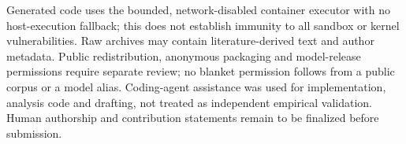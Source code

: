 \documentclass{article}
\begin{document}
Generated code uses the bounded, network-disabled container executor with no
host-execution fallback; this does not establish immunity to all sandbox or
kernel vulnerabilities. Raw archives may contain literature-derived text and
author metadata. Public redistribution, anonymous packaging and model-release
permissions require separate review; no blanket permission follows from a
public corpus or a model alias. Coding-agent assistance was used for
implementation, analysis code and drafting, not treated as independent empirical
validation. Human authorship and contribution statements remain to be finalized
before submission.
\end{document}
